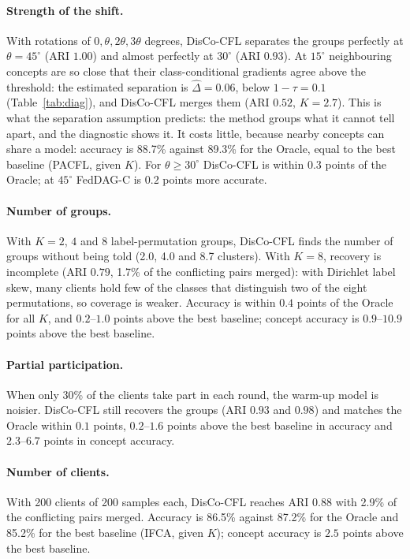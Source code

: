 \paragraph{Strength of the shift.} With rotations of $0,\theta,2\theta,3\theta$ degrees, DisCo-CFL separates the groups perfectly at $\theta=45^\circ$ (ARI $1.00$) and almost perfectly at $30^\circ$ (ARI $0.93$). At $15^\circ$ neighbouring concepts are so close that their class-conditional gradients agree above the threshold: the estimated separation is $\hat\Delta=0.06$, below $1-\tau=0.1$ (Table~\ref{tab:diag}), and DisCo-CFL merges them (ARI $0.52$, $K=2.7$). This is what the separation assumption predicts: the method groups what it cannot tell apart, and the diagnostic shows it. It costs little, because nearby concepts can share a model: accuracy is 88.7\% against 89.3\% for the Oracle, equal to the best baseline (PACFL, given $K$). For $\theta\ge30^\circ$ DisCo-CFL is within $0.3$ points of the Oracle; at $45^\circ$ FedDAG-C is $0.2$ points more accurate.

\paragraph{Number of groups.} With $K=2$, $4$ and $8$ label-permutation groups, DisCo-CFL finds the number of groups without being told (2.0, 4.0 and 8.7 clusters). With $K=8$, recovery is incomplete (ARI $0.79$, 1.7\% of the conflicting pairs merged): with Dirichlet label skew, many clients hold few of the classes that distinguish two of the eight permutations, so coverage is weaker. Accuracy is within $0.4$ points of the Oracle for all $K$, and $0.2$--$1.0$ points above the best baseline; concept accuracy is $0.9$--$10.9$ points above the best baseline.

\paragraph{Partial participation.} When only 30\% of the clients take part in each round, the warm-up model is noisier. DisCo-CFL still recovers the groups (ARI $0.93$ and $0.98$) and matches the Oracle within $0.1$ points, $0.2$--$1.6$ points above the best baseline in accuracy and $2.3$--$6.7$ points in concept accuracy.

\paragraph{Number of clients.} With 200 clients of 200 samples each, DisCo-CFL reaches ARI $0.88$ with 2.9\% of the conflicting pairs merged. Accuracy is 86.5\% against 87.2\% for the Oracle and 85.2\% for the best baseline (IFCA, given $K$); concept accuracy is $2.5$ points above the best baseline.

